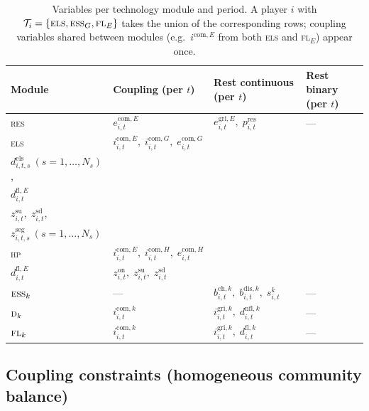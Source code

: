 \documentclass[11pt]{article}
\theoremstyle{definition}
\newcommand{\Tech}{\mathcal{T}}
\begin{document}
\begin{table}[h]
\centering\small
\begin{tabular}{@{}l l l l@{}}
\toprule
Module & Coupling (per $t$) & Rest continuous (per $t$) & Rest binary (per $t$)\\
\midrule
\textsc{res}
  & $e^{\mathrm{com},E}_{i,t}$
  & $e^{\mathrm{gri},E}_{i,t},\; p^{\mathrm{res}}_{i,t}$
  & ---\\[3pt]
\textsc{els}
  & $i^{\mathrm{com},E}_{i,t},\; i^{\mathrm{com},G}_{i,t},\; e^{\mathrm{com},G}_{i,t}$
  & \makecell[tl]{$i^{\mathrm{gri},E}_{i,t},\; e^{\mathrm{gri},G}_{i,t},\; p^{\mathrm{els}}_{i,t}$,\\
                  $d^{\mathrm{els}}_{i,t,s}\ (s=1,\dots,N_s)$,\\
                  $d^{\mathrm{fl},E}_{i,t}$}
  & \makecell[tl]{$z^{\mathrm{on}}_{i,t},\; z^{\mathrm{off}}_{i,t},\; z^{\mathrm{sb}}_{i,t}$,\\
                  $z^{\mathrm{su}}_{i,t},\; z^{\mathrm{sd}}_{i,t}$,\\
                  $z^{\mathrm{seg}}_{i,t,s}\ (s=1,\dots,N_s)$}\\[3pt]
\textsc{hp}
  & $i^{\mathrm{com},E}_{i,t},\; i^{\mathrm{com},H}_{i,t},\; e^{\mathrm{com},H}_{i,t}$
  & \makecell[tl]{$i^{\mathrm{gri},E}_{i,t},\; e^{\mathrm{gri},H}_{i,t},\; p^{\mathrm{hp}}_{i,t}$,\\
                  $d^{\mathrm{fl},E}_{i,t}$}
  & $z^{\mathrm{on}}_{i,t},\; z^{\mathrm{su}}_{i,t},\; z^{\mathrm{sd}}_{i,t}$\\[3pt]
$\textsc{ess}_k$
  & ---
  & $b^{\mathrm{ch},k}_{i,t},\; b^{\mathrm{dis},k}_{i,t},\; s^{k}_{i,t}$
  & ---\\[3pt]
$\textsc{d}_k$
  & $i^{\mathrm{com},k}_{i,t}$
  & $i^{\mathrm{gri},k}_{i,t},\; d^{\mathrm{nfl},k}_{i,t}$
  & ---\\[3pt]
$\textsc{fl}_k$
  & $i^{\mathrm{com},k}_{i,t}$
  & $i^{\mathrm{gri},k}_{i,t},\; d^{\mathrm{fl},k}_{i,t}$
  & ---\\
\bottomrule
\end{tabular}
\caption{Variables per technology module and period.  A player $i$ with
$\Tech_i=\{\textsc{els},\textsc{ess}_G,\textsc{fl}_E\}$ takes the union
of the corresponding rows; coupling variables shared between modules
(e.g.\ $i^{\mathrm{com},E}$ from both \textsc{els} and \textsc{fl}$_E$)
appear once.}
\label{tab:tech-vars}
\end{table}

\subsection{Coupling constraints (homogeneous community balance)}
\end{document}
